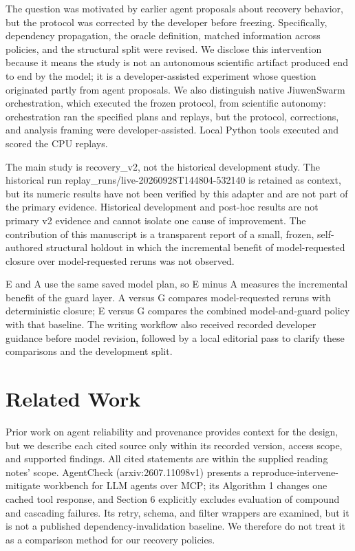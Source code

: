 \documentclass{article}
\begin{document}
The question was motivated by earlier agent proposals about recovery behavior, but the protocol was corrected by the developer before freezing. Specifically, dependency propagation, the oracle definition, matched information across policies, and the structural split were revised. We disclose this intervention because it means the study is not an autonomous scientific artifact produced end to end by the model; it is a developer-assisted experiment whose question originated partly from agent proposals. We also distinguish native JiuwenSwarm orchestration, which executed the frozen protocol, from scientific autonomy: orchestration ran the specified plans and replays, but the protocol, corrections, and analysis framing were developer-assisted. Local Python tools executed and scored the CPU replays.

The main study is recovery\_v2, not the historical development study. The historical run replay\_runs/live-20260928T144804-532140 is retained as context, but its numeric results have not been verified by this adapter and are not part of the primary evidence. Historical development and post-hoc results are not primary v2 evidence and cannot isolate one cause of improvement. The contribution of this manuscript is a transparent report of a small, frozen, self-authored structural holdout in which the incremental benefit of model-requested closure over model-requested reruns was not observed.

E and A use the same saved model plan, so E minus A measures the incremental benefit of the guard layer. A versus G compares model-requested reruns with deterministic closure; E versus G compares the combined model-and-guard policy with that baseline. The writing workflow also received recorded developer guidance before model revision, followed by a local editorial pass to clarify these comparisons and the development split.

\section{Related Work}

Prior work on agent reliability and provenance provides context for the design, but we describe each cited source only within its recorded version, access scope, and supported findings. All cited statements are within the supplied reading notes' scope. AgentCheck (arxiv:2607.11098v1) presents a reproduce-intervene-mitigate workbench for LLM agents over MCP; its Algorithm 1 changes one cached tool response, and Section 6 explicitly excludes evaluation of compound and cascading failures. Its retry, schema, and filter wrappers are examined, but it is not a published dependency-invalidation baseline. We therefore do not treat it as a comparison method for our recovery policies.
\end{document}
